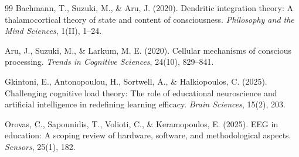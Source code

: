 \documentclass[10pt,journal,compsoc]{IEEEtran}
\begin{document}
\begin{thebibliography}{99}
Bachmann, T., Suzuki, M., \& Aru, J. (2020). Dendritic integration theory: A thalamocortical theory of state and content of consciousness. \textit{Philosophy and the Mind Sciences}, 1(II), 1--24.

Aru, J., Suzuki, M., \& Larkum, M. E. (2020). Cellular mechanisms of conscious processing. \textit{Trends in Cognitive Sciences}, 24(10), 829--841.

Gkintoni, E., Antonopoulou, H., Sortwell, A., \& Halkiopoulos, C. (2025). Challenging cognitive load theory: The role of educational neuroscience and artificial intelligence in redefining learning efficacy. \textit{Brain Sciences}, 15(2), 203.

Orovas, C., Sapounidis, T., Volioti, C., \& Keramopoulos, E. (2025). EEG in education: A scoping review of hardware, software, and methodological aspects. \textit{Sensors}, 25(1), 182.

\end{thebibliography}
\end{document}
